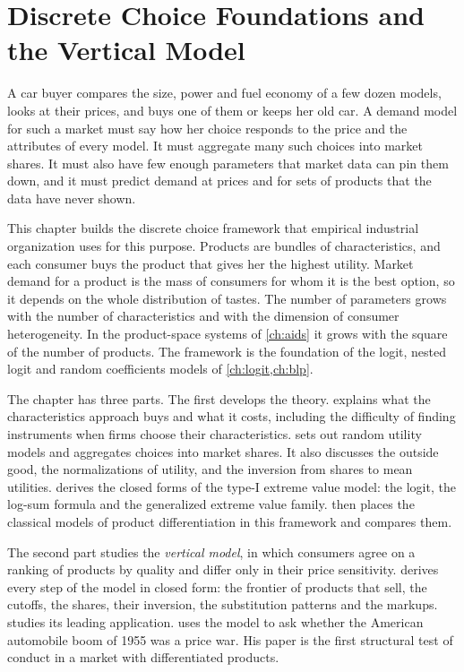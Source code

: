 \chapter{Discrete Choice Foundations and the Vertical Model}\label{ch:discrete}

A car buyer compares the size, power and fuel economy of a few dozen models, looks at their prices, and buys one
of them or keeps her old car. A demand model for such a market must say how her choice responds to the price and
the attributes of every model. It must aggregate many such choices into market shares. It must also have few enough
parameters that market data can pin them down, and it must predict demand at prices and for sets of products that
the data have never shown.

This chapter builds the discrete choice framework that empirical industrial organization uses for this purpose.
Products are bundles of characteristics, and each consumer buys the product that gives her the highest utility.
Market demand for a product is the mass of consumers for whom it is the best option, so it depends on the whole
distribution of tastes. The number of parameters grows with the number of characteristics and with the dimension
of consumer heterogeneity. In the product-space systems of \cref{ch:aids} it grows with the square of the number of
products. The framework is the foundation of the logit, nested logit and random coefficients models of
\cref{ch:logit,ch:blp}.

The chapter has three parts. The first develops the theory.  explains what the
characteristics approach buys and what it costs, including the difficulty of finding instruments when firms choose
their characteristics.  sets out random utility models and aggregates choices into market shares.
It also discusses the outside good, the normalizations of utility, and the inversion from shares to mean utilities.
 derives the closed forms of the type-I extreme value model: the logit, the log-sum formula and the
generalized extreme value family.  then places the classical models of product differentiation in
this framework and compares them.

The second part studies the \emph{vertical model}, in which consumers agree on a ranking of products by quality and
differ only in their price sensitivity.  derives every step of the model in closed form: the
frontier of products that sell, the cutoffs, the shares, their inversion, the substitution patterns and the markups.
 studies its leading application. \citet{Bresnahan1987} uses the model to ask whether the
American automobile boom of 1955 was a price war. His paper is the first structural test of conduct in a market with
differentiated products.


